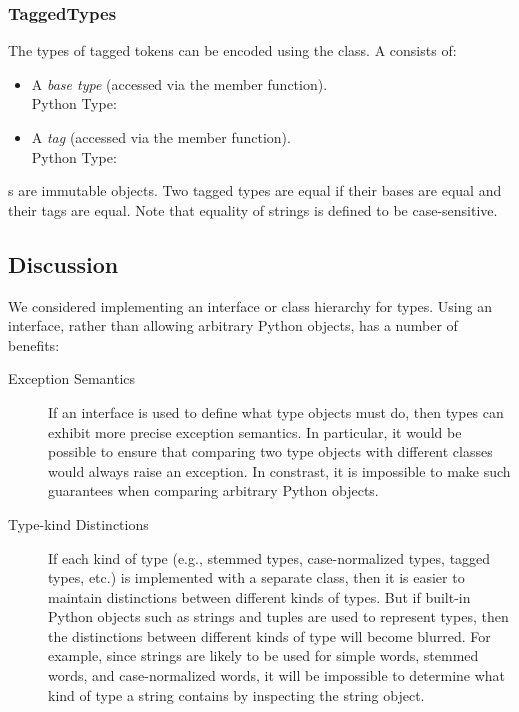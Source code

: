 \documentclass[11pt]{article}
\begin{document}
  \subsubsection{TaggedTypes}
      The types of tagged tokens can be encoded using the
       class.  A  consists of:
  
      \begin{itemize}
    
        \item A \emph{base type} (accessed via the 
        member function).  \\
        Python Type: 
    
        \item A \emph{tag} (accessed via the  member
        function).  \\
        Python Type: 
    
      \end{itemize}
      
      \noindent
      s are immutable objects.  Two tagged types are
      equal if their bases are equal and their tags are equal.  Note
      that equality of strings is defined to be case-sensitive.
    
  \subsection{Discussion}

  We considered implementing an interface or class hierarchy for
  types.  Using an interface, rather than allowing arbitrary Python
  objects, has a number of benefits:

  \begin{description}

    \item[Exception Semantics] If an interface is used to define what
    type objects must do, then types can exhibit more precise
    exception semantics.  In particular, it would be possible to
    ensure that comparing two type objects with different classes
    would always raise an exception.  In constrast, it is impossible
    to make such guarantees when comparing arbitrary Python objects.

    \item[Type-kind Distinctions] If each kind of type (e.g., stemmed
    types, case-normalized types, tagged types, etc.) is implemented
    with a separate class, then it is easier to maintain distinctions
    between different kinds of types.  But if built-in Python objects
    such as strings and tuples are used to represent types, then the
    distinctions between different kinds of type will become blurred.
    For example, since strings are likely to be used for simple words,
    stemmed words, and case-normalized words, it will be impossible to
    determine what kind of type a string contains by inspecting the
    string object.

  \end{description}
\end{document}
